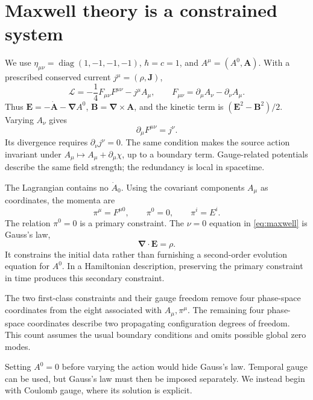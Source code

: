 \documentclass[11pt]{article}
\newcommand{\diag}{\operatorname{diag}}
\newcommand{\Lag}{\mathcal L}
\begin{document}
\section{Maxwell theory is a constrained system}
We use \(\eta_{\mu\nu}=\diag(1,-1,-1,-1)\), \(\hbar=c=1\), and
\(A^\mu=(A^0,\bm A)\). With a prescribed conserved current
\(j^\mu=(\rho,\bm J)\),
\begin{equation}
 \Lag=-\frac14 F_{\mu\nu}F^{\mu\nu}-j^\mu A_\mu,
 \qquad F_{\mu\nu}=\partial_\mu A_\nu-\partial_\nu A_\mu.
\end{equation}
Thus \(\bm E=-\dot{\bm A}-\bm\nabla A^0\),
\(\bm B=\bm\nabla\times\bm A\), and the kinetic term is
\((\bm E^2-\bm B^2)/2\). Varying \(A_\nu\) gives
\begin{equation}
 \partial_\mu F^{\mu\nu}=j^\nu.
 \label{eq:maxwell}
\end{equation}
Its divergence requires \(\partial_\nu j^\nu=0\). The same condition makes
the source action invariant under \(A_\mu\mapsto A_\mu+\partial_\mu\chi\),
up to a boundary term. Gauge-related potentials describe the same field
strength; the redundancy is local in spacetime.

The Lagrangian contains no \(\dot A_0\). Using the covariant components
\(A_\mu\) as coordinates, the momenta are
\begin{equation}
 \pi^\mu=F^{\mu0},\qquad \pi^0=0,\qquad \pi^i=E^i.
\end{equation}
The relation \(\pi^0=0\) is a primary constraint. The \(\nu=0\) equation
in \eqref{eq:maxwell} is Gauss's law,
\begin{equation}
 \bm\nabla\cdot\bm E=\rho.
\end{equation}
It constrains the initial data rather than furnishing a second-order
evolution equation for \(A^0\). In a Hamiltonian description, preserving
the primary constraint in time produces this secondary constraint.

\begin{keyidea}
The two first-class constraints and their gauge freedom remove four
phase-space coordinates from the eight associated with \(A_\mu,\pi^\mu\).
The remaining four phase-space coordinates describe two propagating
configuration degrees of freedom. This count assumes the usual boundary
conditions and omits possible global zero modes.
\end{keyidea}
Setting \(A^0=0\) before varying the action would hide Gauss's law.
Temporal gauge can be used, but Gauss's law must then be imposed separately.
We instead begin with Coulomb gauge, where its solution is explicit.
\end{document}
